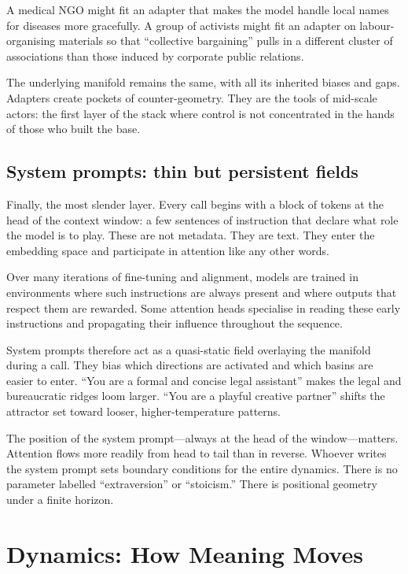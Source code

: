 A medical NGO might fit an adapter that makes the model handle local names for diseases more gracefully. A group of activists might fit an adapter on labour-organising materials so that ``collective bargaining'' pulls in a different cluster of associations than those induced by corporate public relations.

The underlying manifold remains the same, with all its inherited biases and gaps. Adapters create pockets of counter-geometry. They are the tools of mid-scale actors: the first layer of the stack where control is not concentrated in the hands of those who built the base.

\subsection{System prompts: thin but persistent fields}

Finally, the most slender layer. Every call begins with a block of tokens at the head of the context window: a few sentences of instruction that declare what role the model is to play. These are not metadata. They are text. They enter the embedding space and participate in attention like any other words.

Over many iterations of fine-tuning and alignment, models are trained in environments where such instructions are always present and where outputs that respect them are rewarded. Some attention heads specialise in reading these early instructions and propagating their influence throughout the sequence.

System prompts therefore act as a quasi-static field overlaying the manifold during a call. They bias which directions are activated and which basins are easier to enter. ``You are a formal and concise legal assistant'' makes the legal and bureaucratic ridges loom larger. ``You are a playful creative partner'' shifts the attractor set toward looser, higher-temperature patterns.

The position of the system prompt---always at the head of the window---matters. Attention flows more readily from head to tail than in reverse. Whoever writes the system prompt sets boundary conditions for the entire dynamics. There is no parameter labelled ``extraversion'' or ``stoicism.'' There is positional geometry under a finite horizon.


\section{Dynamics: How Meaning Moves}

